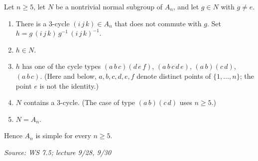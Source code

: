 \documentclass[11pt]{report}
\newcommand{\srcline}[1]{\par\hfill{\footnotesize\textit{Source: #1}}}
\begin{document}
\begin{thmbox}\label{thm:an-simple-n-ge-5}
Let $n \geq 5$, let $N$ be a nontrivial normal subgroup of $A_n$, and let $g \in N$ with $g \neq e$.
\begin{enumerate}
    \item There is a $3$-cycle $(i\,j\,k) \in A_n$ that does not commute with $g$. Set $h = g\,(i\,j\,k)\,g^{-1}\,(i\,j\,k)^{-1}$.
    \item $h \in N$.
    \item $h$ has one of the cycle types $(a\,b\,c)(d\,e\,f)$, $(a\,b\,c\,d\,e)$, $(a\,b)(c\,d)$, $(a\,b\,c)$. (Here and below, $a, b, c, d, e, f$ denote distinct points of $\{1, \ldots, n\}$; the point $e$ is not the identity.)
    \item $N$ contains a $3$-cycle. (The case of type $(a\,b)(c\,d)$ uses $n \geq 5$.)
    \item $N = A_n$.
\end{enumerate}
Hence $A_n$ is simple for every $n \geq 5$.
\srcline{WS 7.5; lecture 9/28, 9/30}
\end{thmbox}
\end{document}
